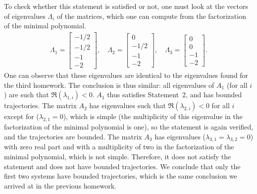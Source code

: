 \documentclass[11pt]{article}
\begin{document}
To check whether this statement is satisfied or not, one must look at the vectors of eigenvalues $\Lambda_i$ of the matrices, which one can compute from the factorization of the minimal polynomial.
\begin{align*}
    \Lambda_1 =\begin{bmatrix}
    -1/2\\
    -1/2\\
    -1\\
    -2
    \end{bmatrix},\quad
    \Lambda_2 =\begin{bmatrix}
    0\\
    -1/2\\
    -1\\
    -2
    \end{bmatrix},\quad
    \Lambda_3 =\begin{bmatrix}
    0\\
    0\\
    -1\\
    -2
    \end{bmatrix}.
\end{align*}
One can observe that these eigenvalues are identical to the eigenvalues found for the third homework. The conclusion is thus similar: all eigenvalues of $A_1$ (for all \(i\)) are such that $\Re(\lambda_{1, i})<0$.
$A_1$ thus satisfies Statement~2, and has bounded trajectories.
The matrix $A_2$ has eigenvalues such that $\Re(\lambda_{2, i})<0$ for all \(i\) except for ($\lambda_{2, 1}=0$), which is simple (the multiplicity of this eigenvalue in the factorization of the minimal polynomial is one), so the statement is again verified, and the trajectories are bounded.
The matrix $A_3$ has eigenvalues ($\lambda_{3, 1} = \lambda_{3, 2} = 0$) with zero real part and with a multiplicity of two in the factorization of the minimal polynomial, which is not simple.
Therefore, it does not satisfy the statement and does not have bounded trajectories.
We conclude that only the first two systems have bounded trajectories, which is the same conclusion we arrived at in the previous homework.
\end{document}
